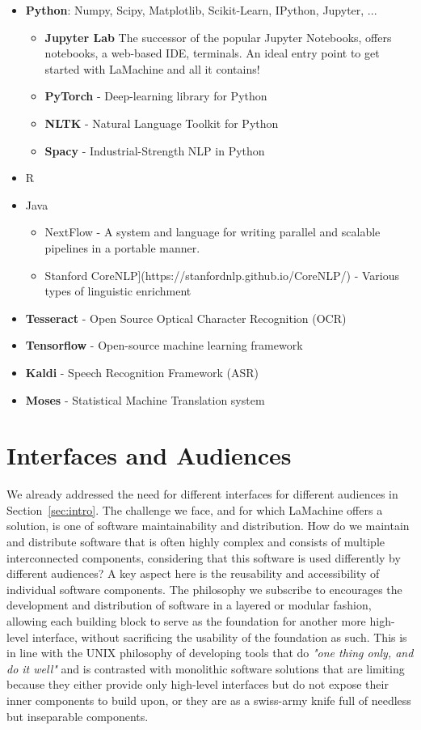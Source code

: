\documentclass[a4paper,11pt]{article}
\begin{document}
\begin{itemize}
    \item \textbf{Python}: Numpy, Scipy, Matplotlib, Scikit-Learn, IPython, Jupyter, ...
    \begin{itemize}
        \item \textbf{Jupyter Lab} The successor of the popular Jupyter Notebooks, offers notebooks, a web-based IDE, terminals. An ideal entry point to get started with LaMachine and all it contains!
        \item \textbf{PyTorch} - Deep-learning library for Python
        \item \textbf{NLTK} - Natural Language Toolkit for Python
        \item \textbf{Spacy} - Industrial-Strength NLP in Python
    \end{itemize}
    \item R
    \item Java
    \begin{itemize}
        \item NextFlow - A system and language for writing parallel and scalable pipelines in a portable manner.
        \item Stanford CoreNLP](https://stanfordnlp.github.io/CoreNLP/) - Various types of linguistic enrichment
    \end{itemize}
    \item \textbf{Tesseract} - Open Source Optical Character Recognition (OCR)
    \item \textbf{Tensorflow} - Open-source machine learning framework
    \item \textbf{Kaldi} - Speech Recognition Framework (ASR)
    \item \textbf{Moses} - Statistical Machine Translation system
\end{itemize}

\section{Interfaces and Audiences}

We already addressed the need for different interfaces for different audiences in Section~\ref{sec:intro}. The challenge we
face, and for which LaMachine offers a solution, is one of software maintainability and distribution. How do we maintain
and distribute software that is often highly complex and consists of multiple interconnected components, considering
that this software is used differently by different audiences? A key aspect here is the reusability and accessibility of individual
software components. The philosophy we subscribe to encourages the development and distribution of software in a layered or modular fashion,
allowing each building block to serve as the foundation for another more high-level interface, without sacrificing the usability of the
foundation as such. This is in line with the UNIX philosophy of developing tools that do \emph{"one thing only, and do
it well"} and is contrasted with monolithic software solutions that are limiting because they either provide only high-level interfaces but do not
expose their inner components to build upon, or they are as a swiss-army knife full of needless but inseparable
components.
\end{document}
